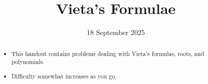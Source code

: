 \documentclass{tufte-handout}
\title{Vieta's Formulae}
\author[IA Math Team]{}
\date{18 September 2025}
\begin{document}
\maketitle

\begin{abstract}
\begin{itemize}
\item This handout contains problems dealing with Vieta's formulas, roots, and polynomials.
\item Difficulty somewhat increases as you go.
\end{itemize}
\end{abstract}


\section{}
\end{document}
